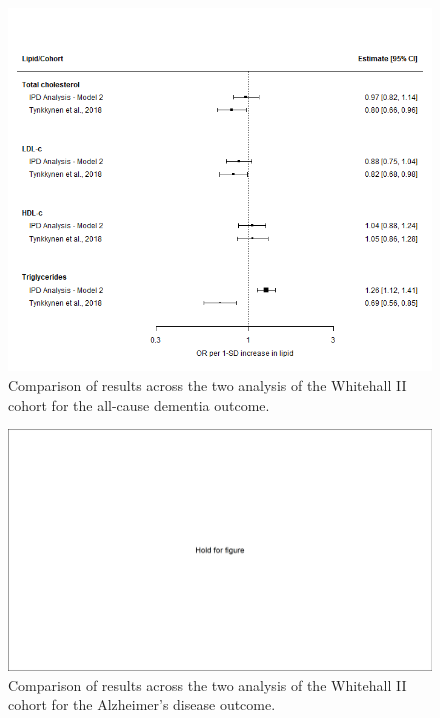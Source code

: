 \documentclass[a4paper, twoside]{templates/ociamthesis}
\begin{document}
\begin{figure}[H]
\includegraphics[width=1\linewidth]{figures/ipd/whitehall_comparison_dementia} \caption[Comparison of results across the two analysis of the Whitehall II cohort]{Comparison of results across the two analysis of the Whitehall II cohort for the all-cause dementia outcome.}\label{fig:whitehallComparisonDementia}
\end{figure}





\begin{figure}[H]
\includegraphics[width=1\linewidth]{figures/hold} \caption[Comparison of results across the two analysis of the Whitehall II cohort]{Comparison of results across the two analysis of the Whitehall II cohort for the Alzheimer's disease outcome.}\label{fig:whitehallComparisonAd}
\end{figure}
\end{document}
